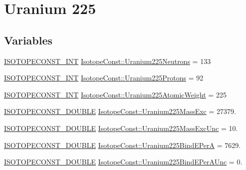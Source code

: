 \hypertarget{group___isotope_const-_uranium-_u225}{}\section{Uranium 225}
\label{group___isotope_const-_uranium-_u225}
\subsection*{Variables}
\begin{DoxyCompactItemize}
\item 
\mbox{\hyperlink{group___isotope_const-_macros_ga5f18360b3e99483a35c32d789e62621c}{I\+S\+O\+T\+O\+P\+E\+C\+O\+N\+S\+T\+\_\+\+I\+NT}} \mbox{\hyperlink{group___isotope_const-_uranium-_u225_gae18d9764164a0c97a1a2533ac4409380}{Isotope\+Const\+::\+Uranium225\+Neutrons}} = 133
\item 
\mbox{\hyperlink{group___isotope_const-_macros_ga5f18360b3e99483a35c32d789e62621c}{I\+S\+O\+T\+O\+P\+E\+C\+O\+N\+S\+T\+\_\+\+I\+NT}} \mbox{\hyperlink{group___isotope_const-_uranium-_u225_gaa25fb90abd0fffa3f11fcc0a6bca713b}{Isotope\+Const\+::\+Uranium225\+Protons}} = 92
\item 
\mbox{\hyperlink{group___isotope_const-_macros_ga5f18360b3e99483a35c32d789e62621c}{I\+S\+O\+T\+O\+P\+E\+C\+O\+N\+S\+T\+\_\+\+I\+NT}} \mbox{\hyperlink{group___isotope_const-_uranium-_u225_ga02245fda5c9f57b70ccb1bc00bd88c30}{Isotope\+Const\+::\+Uranium225\+Atomic\+Weight}} = 225
\item 
\mbox{\hyperlink{group___isotope_const-_macros_ga8f45a7272ce02c0b4c65c44636ed719a}{I\+S\+O\+T\+O\+P\+E\+C\+O\+N\+S\+T\+\_\+\+D\+O\+U\+B\+LE}} \mbox{\hyperlink{group___isotope_const-_uranium-_u225_gac36067bdbcdeb9fad39971aba5ba1c2c}{Isotope\+Const\+::\+Uranium225\+Mass\+Exc}} = 27379.
\item 
\mbox{\hyperlink{group___isotope_const-_macros_ga8f45a7272ce02c0b4c65c44636ed719a}{I\+S\+O\+T\+O\+P\+E\+C\+O\+N\+S\+T\+\_\+\+D\+O\+U\+B\+LE}} \mbox{\hyperlink{group___isotope_const-_uranium-_u225_ga66bc90d6aa8714726e8665848b173e2f}{Isotope\+Const\+::\+Uranium225\+Mass\+Exc\+Unc}} = 10.
\item 
\mbox{\hyperlink{group___isotope_const-_macros_ga8f45a7272ce02c0b4c65c44636ed719a}{I\+S\+O\+T\+O\+P\+E\+C\+O\+N\+S\+T\+\_\+\+D\+O\+U\+B\+LE}} \mbox{\hyperlink{group___isotope_const-_uranium-_u225_gaa7799124b2f57ae6acff7acaafc98e44}{Isotope\+Const\+::\+Uranium225\+Bind\+E\+PerA}} = 7629.
\item 
\mbox{\hyperlink{group___isotope_const-_macros_ga8f45a7272ce02c0b4c65c44636ed719a}{I\+S\+O\+T\+O\+P\+E\+C\+O\+N\+S\+T\+\_\+\+D\+O\+U\+B\+LE}} \mbox{\hyperlink{group___isotope_const-_uranium-_u225_ga11da3edb61ad20f9e5570a0c4a6632e0}{Isotope\+Const\+::\+Uranium225\+Bind\+E\+Per\+A\+Unc}} = 0.

\end{DoxyCompactItemize}
